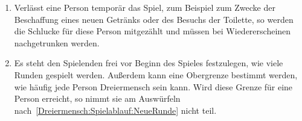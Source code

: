 \begin{enumerate}[label={(\arabic*)}]
	\item
	Verlässt eine Person temporär das Spiel, zum Beispiel zum Zwecke der Beschaffung eines neuen Getränks oder des Besuchs der Toilette, so werden die Schlucke für diese Person mitgezählt und müssen bei Wiedererscheinen nachgetrunken werden.
	
	\item
	Es steht den Spielenden frei vor Beginn des Spieles festzulegen, wie viele Runden gespielt werden.
	Außerdem kann eine Obergrenze bestimmt werden, wie häufig jede Person Dreiermensch sein kann.
	Wird diese Grenze für eine Person erreicht, so nimmt sie am Auswürfeln nach~\ref{Dreiermensch:Spielablauf:NeueRunde} nicht teil.
\end{enumerate}
